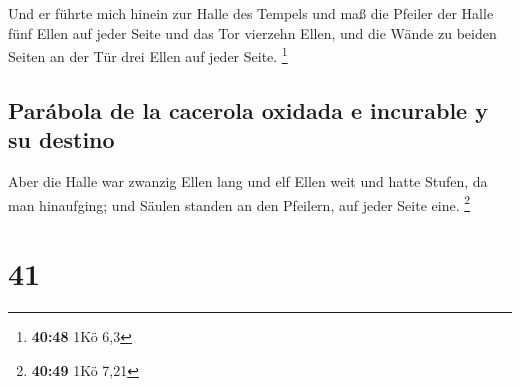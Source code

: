  Und er führte mich hinein zur Halle des Tempels und maß
die Pfeiler der Halle fünf Ellen auf jeder Seite und das Tor vierzehn
Ellen, und die Wände zu beiden Seiten an der Tür drei Ellen auf jeder
Seite. \footnote{\textbf{40:48} 1Kö 6,3}

\hypertarget{paruxe1bola-de-la-cacerola-oxidada-e-incurable-y-su-destino}{%
\subsection{Parábola de la cacerola oxidada e incurable y su
destino}\label{paruxe1bola-de-la-cacerola-oxidada-e-incurable-y-su-destino}}

 Aber die Halle war zwanzig Ellen lang und elf Ellen weit
und hatte Stufen, da man hinaufging; und Säulen standen an den Pfeilern,
auf jeder Seite eine. \footnote{\textbf{40:49} 1Kö 7,21}

\hypertarget{section-40}{%
\section{41}\label{section-40}}

